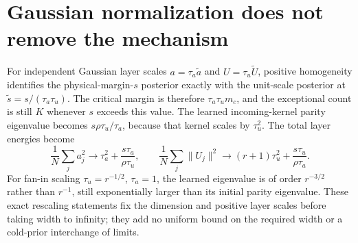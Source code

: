 \documentclass[11pt]{article}
\begin{document}
\section{Gaussian normalization does not remove the mechanism}
For independent Gaussian layer scales $a=\tau_a\widetilde a$ and
$U=\tau_u\widetilde U$, positive homogeneity identifies the
physical-margin-$s$ posterior exactly with the unit-scale posterior at
$\widetilde s=s/(\tau_a\tau_u)$. The critical margin is therefore
$\tau_a\tau_u m_c$, and the exceptional count is still $K$ whenever
$s$ exceeds this value. The learned incoming-kernel parity eigenvalue
becomes $s\rho\tau_u/\tau_a$, because that kernel scales by
$\tau_u^2$. The total layer energies become
\[
 \frac1N\sum_j a_j^2\longrightarrow
       \tau_a^2+\frac{s\tau_a}{\rho\tau_u},\qquad
 \frac1N\sum_j\|U_j\|^2\longrightarrow
       (r+1)\tau_u^2+\frac{s\tau_u}{\rho\tau_a}.
\]
For fan-in scaling $\tau_u=r^{-1/2}$, $\tau_a=1$, the learned
eigenvalue is of order $r^{-3/2}$ rather than $r^{-1}$, still
exponentially larger than its initial parity eigenvalue. These exact
rescaling statements fix the dimension and positive layer scales before
taking width to infinity; they add no uniform bound on the required
width or a cold-prior interchange of limits.
\end{document}
